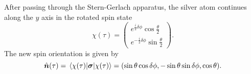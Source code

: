 \documentclass[11pt, a4paper]{article}
\newcommand{\SG}{Stern-Gerlach\xspace}
\renewcommand{\vec}[1]{\bm{#1}}  %
\newcommand{\uvec}[1]{\hat{\vec{#1}}}  %
\begin{document}
\begin{itemize}
   After passing through the \SG apparatus, the silver atom continues along the $ y $ axis in the rotated spin state
    \begin{equation*}
        \chi(\tau) = 
        \begin{pmatrix}
            e^{\frac{i}{2}\delta\phi}\cos \frac{\theta}{2}\\[1mm]
            e^{-\frac{i}{2}\delta\phi}\sin \frac{\theta}{2}
        \end{pmatrix}.
    \end{equation*}
    The new spin orientation is given by
    \begin{equation*}
        \uvec{n}(\tau) = \mel{\chi(\tau)}{\vec{\sigma}}{\chi(\tau)} = (\sin \theta \cos \delta \phi, - \sin \theta \sin \delta \phi, \cos \theta).
    \end{equation*}
    
\end{itemize}
\end{document}
